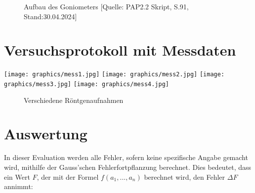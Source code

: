 \documentclass{article}
\begin{document}
\phantom{.}

\begin{figure}[!h]
    \centering
    \caption{Aufbau des Goniometers [Quelle: PAP2.2 Skript, S.91, Stand:30.04.2024]}
    \label{fig:1_Goniometer}
\end{figure}


\newpage

\section{Versuchsprotokoll mit Messdaten}

\texttt{[image: graphics/mess1.jpg]}
\newpage
\texttt{[image: graphics/mess2.jpg]}
\newpage
\texttt{[image: graphics/mess3.jpg]}
\newpage
\texttt{[image: graphics/mess4.jpg]}
\newpage

\addtocounter{table}{1}

\begin{figure}[p]
  \centering
  \hfill
  \hfill
  \hfill
  \hfill
  \caption{Verschiedene Röntgenaufnahmen}
\end{figure}

\clearpage
\newpage
\section{Auswertung}

In dieser Evaluation werden alle Fehler, sofern keine spezifische Angabe gemacht wird, mithilfe der Gauss'schen Fehlerfortpflanzung berechnet. Dies bedeutet, dass ein Wert $F$, der mit der Formel $f(a_1, ..., a_n)$ berechnet wird, den Fehler $\Delta F$ annimmt:
\end{document}
